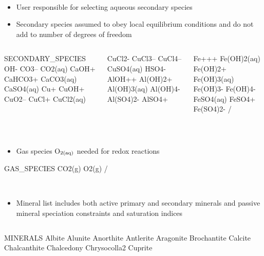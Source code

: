 \documentclass{beamer}
\begin{document}
\begin{frame}
\newpage
~
\begin{itemize}
\item User responsible for selecting aqueous secondary species
\item Secondary species assumed to obey local equilibrium conditions
and do not add to number of degrees of freedom
\end{itemize}
\vspace{-5mm}
  \begin{columns}[c]
\begin{semiverbatim}
  SECONDARY_SPECIES
    OH-
    CO3--
    CO2(aq)
    CaOH+
    CaHCO3+
    CaCO3(aq)
    CaSO4(aq)
    Cu+
    CuOH+
    CuO2--
    CuCl+
    CuCl2(aq)
\end{semiverbatim}
\begin{semiverbatim}
    CuCl2-
    CuCl3--
    CuCl4--
    CuSO4(aq)
    HSO4-
    AlOH++
    Al(OH)2+
    Al(OH)3(aq)
    Al(OH)4-
    Al(SO4)2-
    AlSO4+
\end{semiverbatim}
\begin{semiverbatim}
    Fe+++
    Fe(OH)2(aq)
    Fe(OH)2+
    Fe(OH)3(aq)
    Fe(OH)3-
    Fe(OH)4-
    FeSO4(aq)
    FeSO4+
    Fe(SO4)2-
  /
\end{semiverbatim}
  \end{columns}
  
  \newpage
  ~
  \begin{itemize}
  \item Gas species O$_{\rm 2(aq)}$ needed for redox reactions
  \end{itemize}
\begin{semiverbatim}

  GAS_SPECIES
    CO2(g)
    O2(g)
  /
\end{semiverbatim}
  
  \newpage
  ~
  \begin{itemize}
  \item Mineral list includes both active primary and secondary minerals and passive mineral speciation constraints and saturation indices
  \end{itemize}
  \vspace{-3mm}
  \begin{columns}[c]
\begin{semiverbatim}
  MINERALS
    Albite
    Alunite
    Anorthite
    Antlerite
    Aragonite
    Brochantite
    Calcite
    Chalcanthite
    Chalcedony
    Chrysocolla2
    Cuprite
    

\end{semiverbatim}
\end{columns}
\end{frame}
\end{document}
